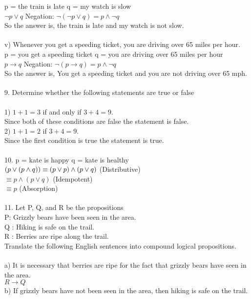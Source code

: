 \documentclass[11pt, oneside]{article}   	%
\begin{document}
\indent p = the train is late   q = my watch is slow\\
\indent $\neg p\lor q$   Negation: $\neg (\neg p\lor q) = p\wedge\neg q$\\
\indent So the answer is, the train is late and my watch is not slow. \\\\
v) Whenever you get a speeding ticket, you are driving over 65 miles per hour.\\
\indent p = you get a speeding ticket   q = you are driving over 65 miles per hour \\
\indent $p\to q$   Negation: $ \neg (p\to q) =  p\wedge\neg q$\\
\indent So the answer is, You get a speeding ticket and you are not driving over 65 mph. \\\\
9. Determine whether the following statements are true or false \\\\
1) $ 1 + 1 = 3$ if and only if  $ 3 + 4 = 9$.\\
\indent Since both of these conditions are false the statement is false.\\
2)   $1 + 1 = 2 $ if   $3 + 4 = 9$. \\
\indent Since the first condition is true the statement is true.\\\\
10. p = kate is happy   q = kate is healthy\\
$(p\lor (p\wedge q))\\
\equiv (p\lor p)\wedge (p\lor q)$ (Distributive)\\
$\equiv p\wedge (p\lor q)$ (Idempotent)\\
$\equiv p $ (Absorption)\\\\
11. Let P, Q, and R be the propositions\\
P:  Grizzly bears have been seen in the area.\\
Q : Hiking is safe on the trail.\\
R : Berries are ripe along the trail.\\
Translate the following English sentences into compound logical propositions.\\\\
a) It is necessary that berries are ripe for the fact that grizzly bears have seen in the area.\\
\indent $R\to Q$\\
b) If grizzly bears have not been seen in the area, then hiking is safe on the trail.\\
\end{document}

